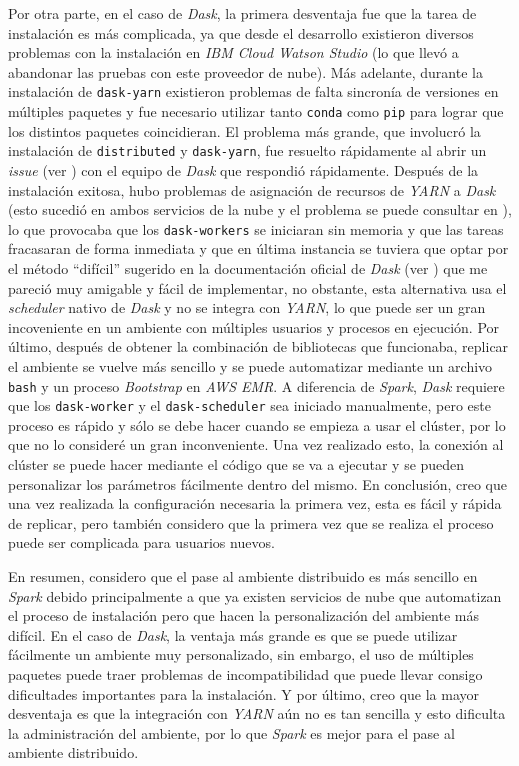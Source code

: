 Por otra parte, en el caso de \textit{Dask}, la primera desventaja fue que la tarea de instalación es más complicada, ya que desde el desarrollo existieron diversos problemas con la instalación en \textit{IBM Cloud Watson Studio} (lo que llevó a abandonar las pruebas con este proveedor de nube). Más adelante, durante la instalación de \texttt{dask-yarn} existieron problemas de falta sincronía de versiones en múltiples paquetes y fue necesario utilizar tanto \texttt{conda} como \texttt{pip} para lograr que los distintos paquetes coincidieran. El problema más grande, que involucró la instalación de \texttt{distributed} y \texttt{dask-yarn}, fue resuelto rápidamente al abrir un \textit{issue} (ver \cite{issue-dask-yarn}) con el equipo de \textit{Dask} que respondió rápidamente. Después de la instalación exitosa, hubo problemas de asignación de recursos de \textit{YARN} a \textit{Dask} (esto sucedió en ambos servicios de la nube y el problema se puede consultar en \cite{q-dask-yarn}), lo que provocaba que los \texttt{dask-workers} se iniciaran sin memoria y que las tareas fracasaran de forma inmediata y que en última instancia se tuviera que optar por el método ``difícil'' sugerido en la documentación oficial de \textit{Dask} (ver \cite{daskdistributedsetup}) que me pareció muy amigable y fácil de implementar, no obstante, esta alternativa usa el \textit{scheduler} nativo de \textit{Dask} y no se integra con \textit{YARN}, lo que puede ser un gran incoveniente en un ambiente con múltiples usuarios y procesos en ejecución. Por último, después de obtener la combinación de bibliotecas que funcionaba, replicar el ambiente se vuelve más sencillo y se puede automatizar mediante un archivo \texttt{bash} y un proceso \textit{Bootstrap} en \textit{AWS EMR}. A diferencia de \textit{Spark}, \textit{Dask} requiere que los \texttt{dask-worker} y el \texttt{dask-scheduler} sea iniciado manualmente, pero este proceso es rápido y sólo se debe hacer cuando se empieza a usar el clúster, por lo que no lo consideré un gran inconveniente. Una vez realizado esto, la conexión al clúster se puede hacer mediante el código que se va a ejecutar y se pueden personalizar los parámetros fácilmente dentro del mismo. En conclusión, creo que una vez realizada la configuración necesaria la primera vez, esta es fácil y rápida de replicar, pero también considero que la primera vez que se realiza el proceso puede ser complicada para usuarios nuevos. 

En resumen, considero que el pase al ambiente distribuido es más sencillo en \textit{Spark} debido principalmente a que ya existen servicios de nube que automatizan el proceso de instalación pero que hacen la personalización del ambiente más difícil. En el caso de \textit{Dask}, la ventaja más grande es que se puede utilizar fácilmente un ambiente muy personalizado, sin embargo, el uso de múltiples paquetes puede traer problemas de incompatibilidad que puede llevar consigo dificultades importantes para la instalación. Y por último, creo que la mayor desventaja es que la integración con \textit{YARN} aún no es tan sencilla y esto dificulta la administración del ambiente, por lo que \textit{Spark} es mejor para el pase al ambiente distribuido. 
